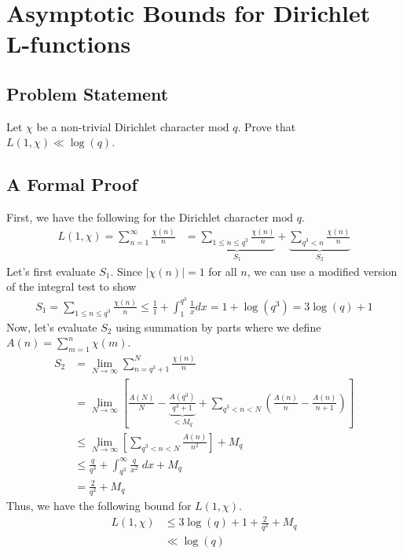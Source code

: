 
\section{Asymptotic Bounds for Dirichlet L-functions}
\subsection{Problem Statement}
Let $\chi$ be a non-trivial Dirichlet character $\text{mod } q$. Prove that $L(1,\chi) \ll \log(q)$.
\subsection{A Formal Proof}
First, we have the following for the Dirichlet character $\text{mod } q$. 
\begin{align*}
L(1,\chi) = \sum_{n=1}^\infty \frac{\chi(n)}{n} &= \underbrace{\sum_{1 \leq n \leq q^3} \frac{\chi(n)}{n}}_{S_1} + \underbrace{\sum_{q^3 < n} \frac{\chi(n)}{n}}_{S_2}
\end{align*}
Let's first evaluate $S_1$. Since $\left|\chi(n)\right| = 1$ for all $n$, we can use a modified version of the integral test to show
\begin{align*}
S_1 = \sum_{1 \leq n \leq q^3} \frac{\chi(n)}{n} \leq \frac{1}{1} + \int_1^{q^3} \frac{1}{x} dx = 1 + \log(q^3) = 3\log(q) + 1
\end{align*}
Now, let's evaluate $S_2$ using summation by parts where we define $A(n) = \sum_{m=1}^n \chi(m)$. 
\begin{align*}
S_2 &= \lim_{N\rightarrow \infty} \sum_{n = q^3 + 1}^N \frac{\chi(n)}{n} \\
&= \lim_{N\rightarrow \infty} \left[ \frac{A(N)}{N} - \underbrace{\frac{A(q^3)}{q^3 + 1}}_{< M_q} +\sum_{q^3 < n < N} \left(\frac{A(n)}{n} - \frac{A(n)}{n+1}\right)\right]\\
&\leq \lim_{N\rightarrow \infty} \left[ \sum_{q^3 < n < N} \frac{A(n)}{n^2}  \right] + M_q\\ 
&\leq \frac{q}{q^3} + \int_{q^3}^\infty \frac{q}{x^2} \;dx + M_q\\
&= \frac{2}{q^2} + M_q
\end{align*}
Thus, we have the following bound for $L(1,\chi)$.
\begin{align*}
  L(1,\chi) &\leq 3\log(q) + 1 + \frac{2}{q^2} + M_q\\
  &\ll \log(q)
\end{align*}

